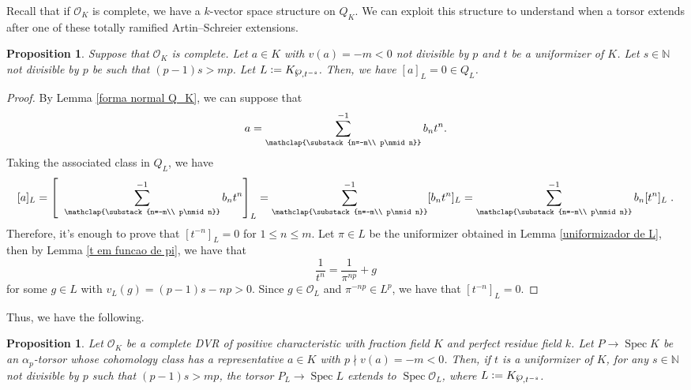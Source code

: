 \documentclass[a4paper,english,12pt]{amsart}
\newtheorem{proposition}[definition]{Proposition}
\numberwithin{equation}{section}
\newcommand{\defeq}{\vcentcolon=}
\DeclareMathOperator{\Spec}{Spec}
\renewcommand{\leq}{\leqslant}
\renewcommand{\wp}{\ensuremath\raisebox{\depth}{$\mathchar"17D$}}
\renewcommand{\_}{\rule{0.25cm}{0.4pt}}
\begin{document}
Recall that if $\mathcal{O}_{K}$ is complete, we have a $k$-vector space structure on $Q_{K}$. We can exploit this structure to understand when a torsor extends after one of these totally ramified Artin--Schreier extensions.

\begin{proposition}\label{matando classes}
    Suppose that $\mathcal{O}_{K}$ is complete. Let $a\in K$ with $v(a)=-m<0$ not divisible by $p$ and $t$ be a uniformizer of $K$. Let $s\in \mathbb{N}$ not divisible by $p$ be such that $(p-1)s>mp$. Let $L\defeq K_{\wp,t^{-s}}$. Then, we have $[a]_{L}=0\in Q_{L}$.
\end{proposition}
\begin{proof}
    By Lemma \ref{forma normal Q_K}, we can suppose that
    \[
    a=\sum_{\mathclap{\substack{n=-m\\
                                     p\nmid n}}}^{-1}
                 b_{n}t^{n}.
    \]
    Taking the associated class in $Q_{L}$, we have
    \[
    [a]_{L}=\left [\;\; \sum_{\mathclap{\substack{n=-m\\
                                     p\nmid n}}}^{-1}
                 b_{n}t^{n} \right ]_{L} = \sum_{\mathclap{\substack{n=-m\\
                                     p\nmid n}}}^{-1}
                 [b_{n}t^{n}]_{L} = \sum_{\mathclap{\substack{n=-m\\
                                     p\nmid n}}}^{-1}
                 b_{n}[t^{n}]_{L}\;.
    \]
    Therefore, it's enough to prove that $[t^{-n}]_{L}=0$ for $1\leq n\leq m$. Let $\pi\in L$ be the uniformizer obtained in Lemma \ref{uniformizador de L}, then by Lemma \ref{t em funcao de pi}, we have that
    \[
    \frac{1}{t^{n}}=\frac{1}{\pi^{np}}+g
    \]
    for some $g\in L$ with $v_{L}(g)=(p-1)s-np>0$. Since $g\in \mathcal{O}_{L}$ and $\pi^{-np}\in L^{p}$, we have that $[t^{-n}]_{L}=0$.
\end{proof}

Thus, we have the following.

\begin{proposition}
    Let $\mathcal{O}_{K}$ be a complete DVR of positive characteristic with fraction field $K$ and perfect residue field $k$. Let $P\to \Spec K$ be an $\alpha_{p}$-torsor whose cohomology class has a representative $a\in K$ with $p\nmid v(a)=-m<0$. Then, if $t$ is a uniformizer of $K$, for any $s\in\mathbb{N}$ not divisible by $p$ such that $(p-1)s>mp$, the torsor $P_{L}\to\Spec L$ extends to $\Spec \mathcal{O}_{L}$, where $L\defeq K_{\wp,t^{-s}}$.
\end{proposition}
\end{document}
